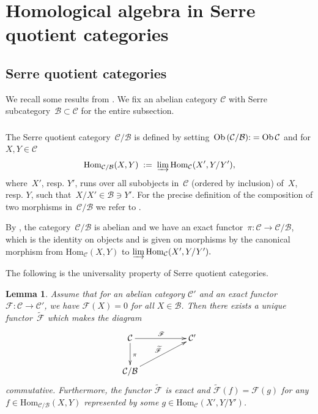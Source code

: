 \documentclass[11pt]{amsart}
\newcommand{\Ffun}{\mathscr{F}}
\newcommand{\cB}{\mathcal B}
\newcommand{\Hom}{\mathrm{Hom}}
\newcommand{\cC}{\mathcal{C}}
\newcommand{\Ob}{{\rm{Ob}\,}}
\numberwithin{equation}{section}
\theoremstyle{plain}
\newtheorem{lemma}[subsubsection]{Lemma}
\theoremstyle{remark}
\newtheorem{rem}[subsubsection]{Remark}
\theoremstyle{remark}
\theoremstyle{construction}
\begin{document}


\appendix

\section{Homological algebra in Serre quotient categories}

\label{AppSerre}

\subsection{Serre quotient categories}We recall some results from \cite[Chapitre~III]{Gabriel}. We fix an abelian category $\cC$ with Serre subcategory~$\cB\subset\cC$ for the entire subsection.

\subsubsection{}The Serre quotient category~$\cC/\cB$ is defined by setting~$\Ob(\cC/\cB){:}=\Ob \cC$ and for $X,Y\in\cC$
$$\Hom_{\cC/\cB}(X,Y)\;:=\;\varinjlim \Hom_{\cC}(X',Y/Y'),$$
where~$X'$, resp. $Y'$, runs over all subobjects in~$\cC$ (ordered by inclusion) of~$X$, resp. $Y$, such that~$X/X'\in\cB\ni Y'$. For the precise definition of the composition of two morphisms in~$\cC/\cB$ we refer to \cite{Gabriel}.


By \cite[Proposition~III.1.1]{Gabriel}, the category~$\cC/\cB$ is abelian and we have an exact functor~$\pi:\cC\to\cC/\cB$, which is the identity on objects and is given on morphisms by the canonical morphism from
$\Hom_{\cC}(X,Y)$ to $\varinjlim \Hom_{\cC}(X',Y/Y').$



The following is the universality property of Serre quotient categories.
\begin{lemma}\cite[Corollaires~III.1.2 and III.1.3]{Gabriel}\label{factorspi}
Assume that for an abelian category $\cC'$ and an exact functor~$\Ffun :\cC\to\cC'$, we have $\Ffun( X)=0$ for all $X\in\cB$. {Then} there exists a unique functor~$\widetilde{\Ffun }$ {which makes the diagram }
$$\xymatrix{
\cC\ar[rr]^{\Ffun}\ar[d]^{\pi}&&\cC'\\
\cC/\cB\ar[rru]^{\widetilde{{\Ffun}}}
}$$
{commutative.}
Furthermore, the functor $\widetilde{{\Ffun}}$ is exact
and  $\widetilde{{\Ffun}}(f)={\Ffun}(g)$ for any $f\in \Hom_{\cC/\cB}(X,Y)$ represented by some $g\in \Hom_{\cC}(X',Y/Y')$.
\end{lemma}
\end{document}
